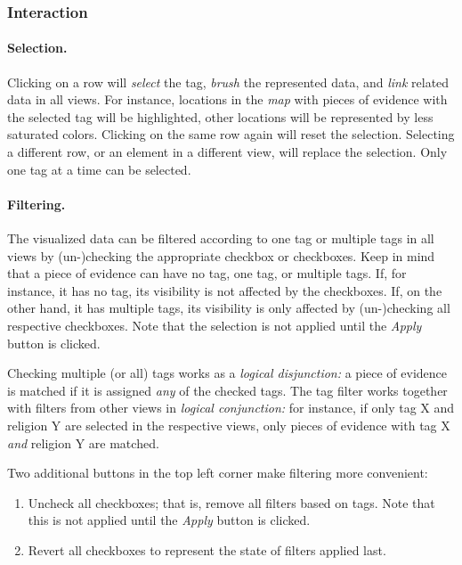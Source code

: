 \subsubsection{Interaction}
\label{sec:tags-interaction}

\paragraph{Selection.}
Clicking on a row will \emph{select} the tag, \emph{brush} the represented data, and \emph{link} related data in all views.
For instance, locations in the \emph{map} with pieces of evidence with the selected tag will be highlighted, other locations will be represented by less saturated colors.
Clicking on the same row again will reset the selection.
Selecting a different row, or an element in a different view, will replace the selection.
Only one tag at a time can be selected.

\paragraph{Filtering.}
The visualized data can be filtered according to one tag or multiple tags in all views by (un-)checking the appropriate checkbox or checkboxes.
Keep in mind that a piece of evidence can have no tag, one tag, or multiple tags.
If, for instance, it has no tag, its visibility is not affected by the checkboxes.
If, on the other hand, it has multiple tags, its visibility is only affected by (un-)checking all respective checkboxes.
Note that the selection is not applied until the \emph{Apply} button is clicked.

Checking multiple (or all) tags works as a \emph{logical disjunction:}
a piece of evidence is matched if it is assigned \emph{any} of the checked tags.
The tag filter works together with filters from other views in \emph{logical conjunction:}
for instance, if only tag X and religion Y are selected in the respective views, only pieces of evidence with tag X \emph{and} religion Y are matched.

Two additional buttons in the top left corner make filtering more convenient:

\begin{enumerate}
  \item
    Uncheck all checkboxes;
    that is, remove all filters based on tags.
    Note that this is not applied until the \emph{Apply} button is clicked.

  \item Revert all checkboxes to represent the state of filters applied last.
\end{enumerate}


